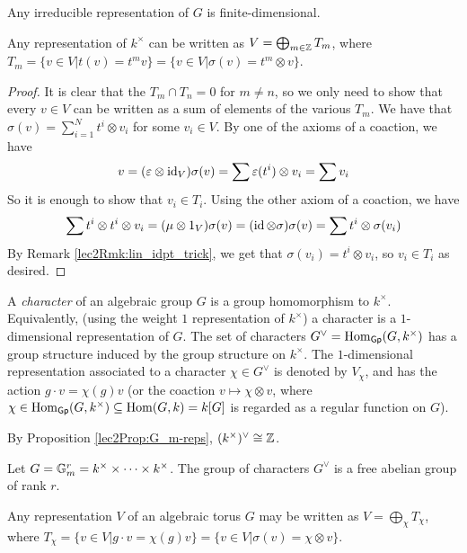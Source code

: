 \begin{corollary}
 Any irreducible representation of $G$ is finite-dimensional.
\end{corollary}
\begin{proposition}\label{lec2Prop:G_m-reps}
 Any representation of $k^\times$ can be written as $V=\bigoplus_{m\in \mathbb{Z}}T_m$, where $T_m=\{v\in V| t(v)=t^mv\} = \{v\in V|\sigma(v)=t^m\otimes v\}$.
\end{proposition}
\begin{proof}
 It is clear that the $T_m\cap T_n=0$ for $m\neq n$, so we only need to show that every $v\in V$ can be written as a sum of elements of the various $T_m$. We have that $\sigma(v)=\sum_{i=1}^N t^i\otimes v_i$ for some $v_i\in V$. By one of the axioms of a coaction, we have
  \[
  v = (\varepsilon\otimes\operatorname{id}_V)\sigma(v) = \sum \varepsilon(t^i)\otimes v_i = \sum v_i
 \]
 So it is enough to show that $v_i\in T_i$. Using the other axiom of a coaction, we have
 \[
  \sum t^i\otimes t^i\otimes v_i = (\mu\otimes 1_V)\sigma(v) = (\operatorname{id}\otimes \sigma)\sigma(v) = \sum t^i\otimes \sigma(v_i)
 \]
 By Remark \ref{lec2Rmk:lin_idpt_trick}, we get that $\sigma(v_i)=t^i\otimes v_i$, so $v_i\in T_i$ as desired.
\end{proof}
\begin{definition}
 A \emph{character} of an algebraic group $G$ is a group homomorphism to $k^\times$. Equivalently, (using the weight $1$ representation of $k^\times$) a character is a $1$-dimensional representation of $G$. The set of characters $G^\vee =\operatorname{Hom}_{\text{\sf Gp}}(G,k^\times)$ has a group structure induced by the group structure on $k^\times$. The $1$-dimensional representation associated to a character $\chi\in G^\vee$ is denoted by $V_\chi$, and has the action $g\cdot v=\chi(g)v$ (or the coaction $v\mapsto \chi\otimes v$, where $\chi\in\operatorname{Hom}_{\text{\sf Gp}}(G,k^\times)\subseteq \operatorname{Hom}(G,k)=k[G]$ is regarded as a regular function on $G$).
\end{definition}
\begin{example}
 By Proposition \ref{lec2Prop:G_m-reps}, $(k^\times)^\vee\cong \mathbb{Z}$.
\end{example}
\begin{example}
 Let $G=\mathbb{G}_m^r=k^\times\times\cdots \times k^\times$. The group of characters $G^\vee$ is a free abelian group of rank $r$.
\end{example}
\begin{corollary}
 Any representation $V$ of an algebraic torus $G$ may be written as $V=\bigoplus_{\chi} T_\chi$, where $T_\chi=\{v\in V|g\cdot v=\chi(g)v\}=\{v\in V|\sigma(v)=\chi\otimes v\}$.
\end{corollary}
